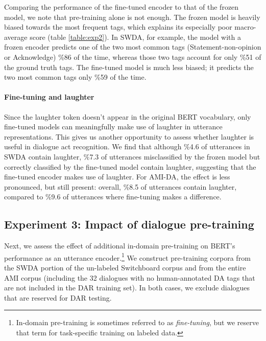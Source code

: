 \documentclass[11pt,a4paper]{article}
\begin{document}
Comparing the performance of the fine-tuned encoder to that of the frozen model, we note that pre-training alone is not enough.
The frozen model is heavily biased towards the most frequent tags, which explains its especially poor macro-average score (table \ref{table:exp2}).
In SWDA, for example, the model with a frozen encoder predicts one of the two most common tags (Statement-non-opinion or Acknowledge) \%86 of the time, whereas those two
tags account for only \%51 of the ground truth tags.
The fine-tuned model is much less biased; it predicts the two most common tags only \%59 of the time.




\paragraph{Fine-tuning and laughter}
Since the laughter token doesn't appear in the original BERT vocabulary, only fine-tuned models can meaningfully make use of laughter in utterance representations. 
This gives us another opportunity to assess whether laughter is useful in dialogue act recognition.
We find that although \%4.6 of utterances in SWDA contain laughter, 
\%7.3 of utterances misclassified by the frozen model but correctly classified by the fine-tuned model contain laughter, 
suggesting that the fine-tuned encoder makes use of laughter. 
For AMI-DA, the effect is less pronounced, but still present: 
overall, \%8.5 of utterances contain laughter, 
compared to \%9.6 of utterances where fine-tuning makes a difference. 

\subsection{Experiment 3: Impact of dialogue pre-training} \label{sec:experiment3} %

Next, we assess the effect of additional in-domain pre-training on BERT's performance as an utterance encoder.\footnote{
In-domain pre-training is sometimes referred to as \textit{fine-tuning}, but we reserve that term for task-specific training on labeled data.}
We construct pre-training corpora from the SWDA portion of the un-labeled Switchboard corpus and from the entire AMI corpus (including the 32 dialogues with no human-annotated DA tags that are not included in the DAR training set).
In both cases, we exclude dialogues that are reserved for DAR testing.
\end{document}
